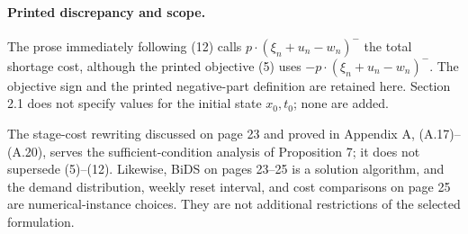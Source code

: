 \documentclass{article}
\begin{document}
\paragraph{Printed discrepancy and scope.}
The prose immediately following (12) calls $p\cdot(\xi_n+u_n-w_n)^-$ the total shortage cost, although the printed objective (5) uses $-p\cdot(\xi_n+u_n-w_n)^-$. The objective sign and the printed negative-part definition are retained here. Section 2.1 does not specify values for the initial state $x_0,t_0$; none are added.

The stage-cost rewriting discussed on page 23 and proved in Appendix A, (A.17)--(A.20), serves the sufficient-condition analysis of Proposition 7; it does not supersede (5)--(12). Likewise, BiDS on pages 23--25 is a solution algorithm, and the demand distribution, weekly reset interval, and cost comparisons on page 25 are numerical-instance choices. They are not additional restrictions of the selected formulation.
\end{document}
